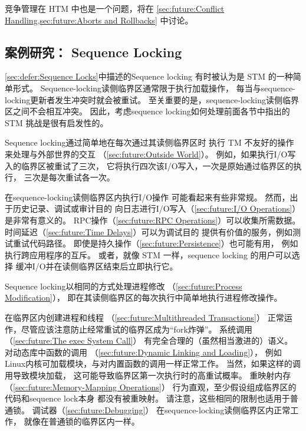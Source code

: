 竞争管理在 HTM 中也是一个问题，将在
\cref{sec:future:Conflict Handling,sec:future:Aborts and Rollbacks}
中讨论。

\QuickQuizEnd

\subsection{案例研究：
	    Sequence Locking}
\label{sec:future:Case Study: Sequence Locking}

\cref{sec:defer:Sequence Locks}中描述的Sequence locking
有时被认为是 STM 的一种简单形式。
Sequence-locking读侧临界区通常限于执行加载操作，
每当与sequence-locking更新者发生冲突时就会被重试。
至关重要的是，sequence-locking读侧临界区之间不会相互冲突。
因此，考虑sequence locking如何处理前面各节中指出的
STM 挑战是很有启发性的。

Sequence locking通过简单地在每次通过其读侧临界区时
执行 TM 不友好的操作来处理与外部世界的交互
（\cref{sec:future:Outside World}）。
例如，如果执行I/O写入的临界区被重试了三次，
它将执行四次该I/O写入，一次是原始通过临界区的执行，
三次是每次重试各一次。

在sequence-locking读侧临界区内执行I/O操作
可能看起来有些非常规。
然而，出于历史记录、调试或审计目的
向日志进行I/O写入（\cref{sec:future:I/O Operations}）
是非常有意义的。
RPC操作（\cref{sec:future:RPC Operations}）可以收集所需数据。
时间延迟（\cref{sec:future:Time Delays}）可以为调试目的
提供有价值的服务，例如测试重试代码路径。
即使是持久操作（\cref{sec:future:Persistence}）也可能有用，
例如执行跨应用程序的互斥。
或者，就像 STM 一样，sequence locking 的用户可以选择
缓冲I/O并在读侧临界区结束后立即执行它。

Sequence locking以相同的方式处理进程修改
（\cref{sec:future:Process Modification}），
即在其读侧临界区的每次执行中简单地执行进程修改操作。

在临界区内创建进程和线程
（\cref{sec:future:Multithreaded Transactions}）
正常运作，尽管应该注意防止经常重试的临界区成为``fork炸弹''。
系统调用（\cref{sec:future:The exec System Call}）
有完全合理的（虽然相当激进的）语义。
对动态库中函数的调用
（\cref{sec:future:Dynamic Linking and Loading}），
例如Linux内核可加载模块，与对内置函数的调用一样正常工作。
当然，如果这样的调用导致模块加载，
这可能导致临界区第一次执行时的高重试概率。
重映射内存（\cref{sec:future:Memory-Mapping Operations}）
行为直观，至少假设组成临界区的代码和sequence lock本身
都没有被重映射。
请注意，这些相同的限制也适用于普通锁。
调试器（\cref{sec:future:Debugging}）
在sequence-locking读侧临界区内正常工作，
就像在普通锁的临界区内一样。

